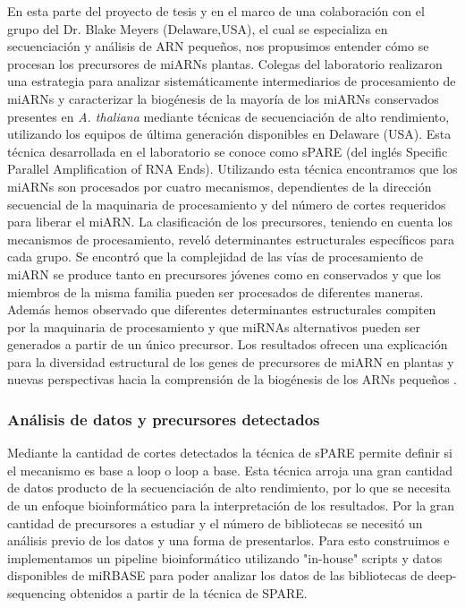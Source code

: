 En esta parte del proyecto de tesis y en el marco de una colaboración con el grupo del Dr. Blake Meyers (Delaware,USA), el cual se especializa en secuenciación y análisis de ARN pequeños, nos propusimos entender cómo se procesan los precursores de miARNs plantas. 
Colegas del laboratorio realizaron una estrategia para analizar sistemáticamente intermediarios de procesamiento de miARNs y caracterizar la biogénesis de la mayoría de los miARNs conservados presentes en \textit{A. thaliana} mediante técnicas de secuenciación de alto rendimiento, utilizando los equipos de última generación disponibles en Delaware (USA).
Esta técnica desarrollada en el laboratorio se conoce como sPARE \citep{Schapire2013} (del inglés Specific Parallel Amplification of RNA Ends).
Utilizando esta técnica encontramos que los miARNs son procesados por cuatro mecanismos, dependientes de la dirección secuencial de la maquinaria de procesamiento y del número de cortes requeridos para liberar el miARN.
La clasificación de los precursores, teniendo en cuenta los mecanismos de procesamiento, reveló determinantes estructurales específicos para cada grupo.
Se encontró que la complejidad de las vías de procesamiento de miARN se produce tanto en precursores jóvenes como en conservados y que los miembros de la misma familia pueden ser procesados de diferentes maneras.
Además hemos observado que diferentes determinantes estructurales compiten por la maquinaria de procesamiento y que miRNAs alternativos pueden ser generados a partir de un único precursor.
Los resultados ofrecen una explicación para la diversidad estructural de los genes de precursores de miARN en plantas y nuevas perspectivas hacia la comprensión de la biogénesis de los ARNs pequeños \citep{Bologna2013}.


\subsubsection{Análisis de datos y precursores detectados}
Mediante la cantidad de cortes detectados la técnica de sPARE permite definir si el mecanismo es base a loop o loop a base.
Esta técnica arroja una gran cantidad de datos producto de la secuenciación de alto rendimiento, por lo que se necesita de un enfoque bioinformático para la interpretación de los resultados.
Por la gran cantidad de precursores a estudiar y el número de bibliotecas se necesitó un análisis previo de los datos y una forma de presentarlos.
Para esto construimos e implementamos un pipeline bioinformático utilizando "in-house" scripts y datos disponibles de miRBASE para poder analizar los datos de las bibliotecas de deep-sequencing obtenidos a partir de la técnica de SPARE.

